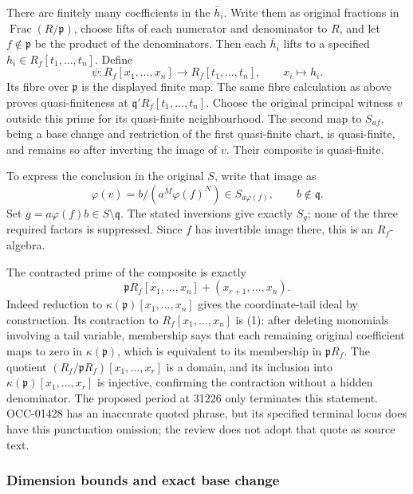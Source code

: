 There are finitely many coefficients in the \(\bar h_i\). Write them as original fractions in \(\operatorname{Frac}(R/\mathfrak p)\), choose lifts of each numerator and denominator to \(R\), and let \(f\notin\mathfrak p\) be the product of the denominators. Then each \(\bar h_i\) lifts to a specified \(h_i\in R_f[t_1,\ldots,t_n]\). Define \[
 \psi:R_f[x_1,\ldots,x_n]\longrightarrow R_f[t_1,\ldots,t_n],
 \qquad x_i\longmapsto h_i.
\] Its fibre over \(\mathfrak p\) is the displayed finite map. The same fibre calculation as above proves quasi-finiteness at \(\mathfrak q'R_f[t_1,\ldots,t_n]\). Choose the original principal witness \(v\) outside this prime for its quasi-finite neighbourhood. The second map to \(S_{af}\), being a base change and restriction of the first quasi-finite chart, is quasi-finite, and remains so after inverting the image of \(v\). Their composite is quasi-finite.

To express the conclusion in the original \(S\), write that image as \[
 \varphi(v)=b/(a^M\varphi(f)^N)\in S_{a\varphi(f)},
 \qquad b\notin\mathfrak q.
\] Set \(g=a\varphi(f)b\in S\setminus\mathfrak q\). The stated inversions give exactly \(S_g\); none of the three required factors is suppressed. Since \(f\) has invertible image there, this is an \(R_f\)-algebra.

The contracted prime of the composite is exactly \[
 \mathfrak pR_f[x_1,\ldots,x_n]+
                      (x_{r+1},\ldots,x_n).
 \tag{1}
\] Indeed reduction to \(\kappa(\mathfrak p)[x_1,\ldots,x_n]\) gives the coordinate-tail ideal by construction. Its contraction to \(R_f[x_1,\ldots,x_n]\) is (1): after deleting monomials involving a tail variable, membership says that each remaining original coefficient maps to zero in \(\kappa(\mathfrak p)\), which is equivalent to its membership in \(\mathfrak pR_f\). The quotient \((R_f/\mathfrak pR_f)[x_1,\ldots,x_r]\) is a domain, and its inclusion into \(\kappa(\mathfrak p)[x_1,\ldots,x_r]\) is injective, confirming the contraction without a hidden denominator. The proposed period at 31226 only terminates this statement. OCC-01428 has an inaccurate quoted phrase, but its specified terminal locus does have this punctuation omission; the review does not adopt that quote as source text.

\subsubsection{Dimension bounds and exact base change}\label{dimension-bounds-and-exact-base-change}

